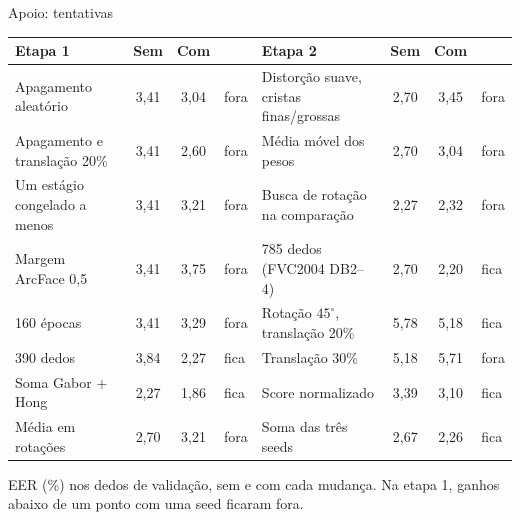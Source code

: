 \documentclass[
  aspectratio = 169,
  10pt,
  t,
  onlytextwidth,
  compress,
  handout,
  xcolor = table,
  english,
  brazilian,
]{beamer}
\begin{document}
\begin{frame}{Apoio: tentativas}
\centering
\scriptsize
\setlength{\tabcolsep}{4pt}
\begin{tabular}{@{}lccl@{\hspace{8mm}}lccl@{}}
\toprule
Etapa 1 & Sem & Com & & Etapa 2 & Sem & Com & \\
\midrule
Apagamento aleatório & 3,41 & 3,04 & fora & Distorção suave, cristas finas/grossas & 2,70 & 3,45 & fora \\
Apagamento e translação 20\% & 3,41 & 2,60 & fora & Média móvel dos pesos & 2,70 & 3,04 & fora \\
Um estágio congelado a menos & 3,41 & 3,21 & fora & Busca de rotação na comparação & 2,27 & 2,32 & fora \\
Margem ArcFace 0,5 & 3,41 & 3,75 & fora & 785 dedos (FVC2004 DB2--4) & 2,70 & 2,20 & \alert{fica} \\
160 épocas & 3,41 & 3,29 & fora & Rotação $45^\circ$, translação 20\% & 5,78 & 5,18 & \alert{fica} \\
390 dedos & 3,84 & 2,27 & \alert{fica} & Translação 30\% & 5,18 & 5,71 & fora \\
Soma Gabor + Hong & 2,27 & 1,86 & \alert{fica} & Score normalizado & 3,39 & 3,10 & \alert{fica} \\
Média em rotações & 2,70 & 3,21 & fora & Soma das três seeds & 2,67 & 2,26 & \alert{fica} \\
\bottomrule
\end{tabular}
\par\medskip
\footnotesize
EER (\%) nos dedos de validação, sem e com cada mudança. Na etapa 1, ganhos abaixo de um ponto com uma seed ficaram fora.
\end{frame}
\end{document}

